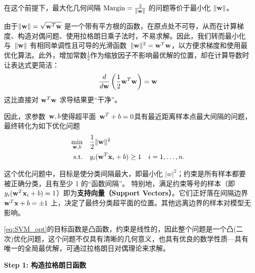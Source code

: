 
在这个前提下，最大化几何间隔 $\text{Margin} = \frac{2}{\|{\bf w}\|}$ 的问题等价于最小化 $\|{\bf w}\|$。

由于$\|{\bf w}\| = \sqrt{{\bf w}^T {\bf w}}$ 是一个带有平方根的函数，在原点处不可导，从而在计算梯度、构造对偶问题、使用拉格朗日乘子法时，不易求解。因此，我们转而最小化与~$\|{\bf w}\|$ 有相同单调性且可导的光滑函数~$ \|{\bf w}\|^2 ={\bf w}^T {\bf w}$，以方便求梯度和使用最优化算法。此外，增加常数$\frac{1}{2}$作为缩放因子不影响最优解的位置，却在计算导数时让表达式更简洁：
$$
\frac{d }{d {\bf w}}\left(\frac{1}{2}{\bf w}^T {\bf w} \right) = {\bf w}
$$
这比直接对 ${\bf w}^T {\bf w}$ 求导结果更“干净”。

因此，求参数~${\bf w},b$使得超平面~${\bf w}^T+b=0$具有最近距离样本点最大间隔的问题，最终转化为如下优化问题
\begin{equation}\label{eq:SVM_opt}
\begin{aligned}
\min_{{\bf w},b} \quad & \frac{1}{2} \|{\bf w}\|^2 \\
\text{s.t.} \quad & y_i({\bf w}^T {\bf x}_i + b ) \geq 1 \quad i=1,\dots,n.
\end{aligned}
\end{equation}

这个优化问题中，目标是使分类间隔最大，即最小化 $ |w|^2 $；约束是所有样本都要被正确分类，且有至少 1 的“函数间隔”。
特别地，满足约束等号的样本（即 $y_i({\bf w}^T {\bf x}_i + b) = 1$）即为\textbf{支持向量（Support Vectors）}。它们正好落在间隔边界 ${\bf w}^T {\bf x} + b= \pm 1$ 上，决定了最终分类超平面的位置。其他远离边界的样本对模型无影响。

\eqref{eq:SVM_opt}的目标函数是凸函数，约束是线性的，因此整个问题是一个凸(二次)优化问题，这个问题不仅具有清晰的几何意义，也具有优良的数学性质---具有唯一的全局最优解，可通过拉格朗日对偶理论来求解。

\textbf{Step 1: 构造拉格朗日函数}


